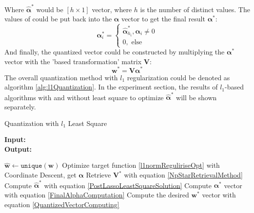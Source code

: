 \documentclass[preprint,10pt]{elsarticle}
\begin{document}
Where $\boldsymbol{\hat{\alpha}}^{*}$ would be $[h \times 1]$ vector, where $h$ is the number of distinct values. The values of could be put back into the $\boldsymbol{\alpha}$ vector to get the final result $\boldsymbol{\alpha}^{*}$:\\
\begin{equation}
\label{FinalAlphaComputation}
\boldsymbol{\alpha}^{*}_{i} = 
\begin{cases}
\boldsymbol{\hat{\alpha}}^{*}_{h_{i}}, \boldsymbol{\alpha}_{i} \neq 0 \\
0, \text{ else}
\end{cases}
\end{equation}
And finally, the quantized vector could be constructed by multiplying the $\boldsymbol{\alpha}^{*}$ vector with the 'based transformation' matrix $\boldsymbol{V}$:\\
\begin{equation}
\label{QuantizedVectorComputing}
\boldsymbol{w}^{*} = \boldsymbol{V}\boldsymbol{\alpha}^{*}
\end{equation}
The overall quantization method with $l_1$ regularization could be denoted as algorithm \ref{alg:l1Quantization}. In the experiment section, the results of $l_1$-based algorithms with and without least square to optimize $\boldsymbol{\hat{\alpha}}^{*}$ will be shown separately.
\begin{algorithm}
\caption{Quantization with $l_1$ Least Square}\label{alg:l1Quantization}
\hspace*{\algorithmicindent} \textbf{Input: } \\
\hspace*{\algorithmicindent} \textbf{Output: } 
\begin{algorithmic}[1]
\State $\boldsymbol{\hat{w}} \gets \texttt{unique}(\boldsymbol{w})$
\State Optimize target function \ref{l1normReguliriseOpt} with Coordinate Descent, get $\boldsymbol{\alpha}$
\State Retrieve $\boldsymbol{V}^{*}$ with equation \ref{NpStarRetrievalMethod}
\State Compute $\boldsymbol{\hat{\alpha}}^{*}$ with equation \ref{PostLassoLeastSquareSolution}
\State Compute $\boldsymbol{\alpha}^{*}$ vector with equation \ref{FinalAlphaComputation}
\State Compute the desired $\boldsymbol{w}^{*}$ vector with equation \ref{QuantizedVectorComputing}
\end{algorithmic}
\end{algorithm}
\end{document}
